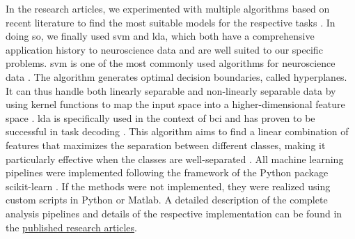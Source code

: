 \noindent In the research articles, we experimented with multiple algorithms based on recent literature to find the most suitable models for the respective tasks \cite{Shoorangiz2023}. In doing so, we finally used \gls{svm} and \gls{lda}, which both have a comprehensive application history to neuroscience data and are well suited to our specific problems.  \Gls{svm} is one of the most commonly used algorithms for neuroscience data \cite{Varoquaux2017}. The algorithm generates optimal decision boundaries, called hyperplanes. It can thus handle both linearly separable and non-linearly separable data by using kernel functions to map the input space into a higher-dimensional feature space \cite{Shoorangiz2023}. \Gls{lda} is specifically used in the context of \Gls{bci} and has proven to be successful in task decoding \cite{Blankertz2008}. This algorithm aims to find a linear combination of features that maximizes the separation between different classes, making it particularly effective when the classes are well-separated \cite{Shoorangiz2023}.
\newpage
\noindent All machine learning pipelines were implemented following the framework of the Python package scikit-learn \cite{Pedregosa2011}. If the methods were not implemented, they were realized using custom scripts in Python or Matlab. A detailed description of the complete analysis pipelines and details of the respective implementation can be found in the \hyperref[pub:papers]{published research articles}. 
